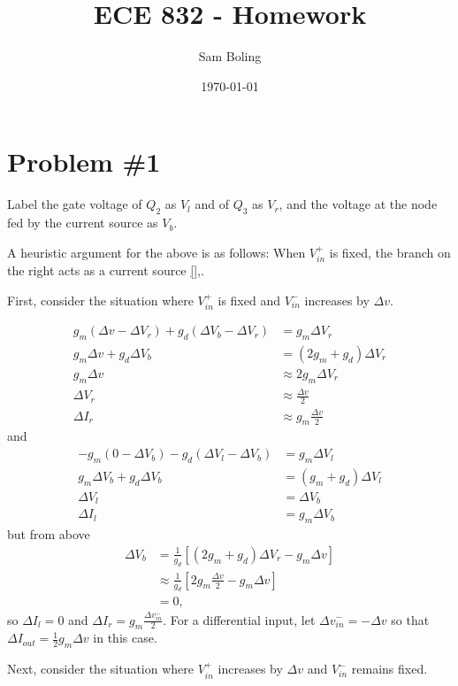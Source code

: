 \documentclass{article}
\title{ECE 832 - Homework}
\author{Sam Boling}
\date{\today}
\begin{document}
\maketitle

\section*{Problem \#1}

Label the gate voltage of $Q_2$ as $V_l$ and of $Q_3$ as $V_r$, and the
voltage at the node fed by the current source as $V_b$.

A heuristic argument for the above is as follows:
When $V_{in}^{+}$ is fixed, the branch on
the right acts as a current source \ref{},. 

First, consider the situation where $V_{in}^{+}$ is fixed and
$V_{in}^{-}$ increases by $\Delta v$.

\begin{align*}
g_m (\Delta v - \Delta V_r) + g_d (\Delta V_b - \Delta V_r) &= g_m \Delta V_r \\
g_m \Delta v + g_d \Delta V_b &= (2 g_m + g_d) \Delta V_r \\
g_m \Delta v &\approx 2 g_m \Delta V_r \\
\Delta V_r &\approx \frac{\Delta v}{2} \\
\Delta I_r &\approx g_m \frac{\Delta v}{2}
\end{align*}
and
\begin{align*}
-g_m (0 - \Delta V_b) - g_d (\Delta V_l - \Delta V_b) &= g_m \Delta V_l \\
g_m \Delta V_b + g_d \Delta V_b &= (g_m + g_d) \Delta V_l \\
\Delta V_l &= \Delta V_b \\
\Delta I_l &= g_m \Delta V_b
\end{align*}
but from above
\begin{align*}
\Delta V_b &= \frac{1}{g_d} [(2 g_m + g_d) \Delta V_r - g_m \Delta v] \\
           &\approx \frac{1}{g_d} [2 g_m \frac{\Delta v}{2} - g_m \Delta v] \\
           &= 0,
\end{align*}
so $\Delta I_l = 0$ and $\Delta I_r = g_m \frac{\Delta v_{in}^{-}}{2}$. For a
differential input, let $\Delta v_{in}^{-} = -\Delta v$ so that
$\Delta I_{out} = \frac{1}{2} g_m \Delta v$ in this case.

Next, consider the situation where $V_{in}^{+}$ increases by $\Delta v$ 
and $V_{in}^{-}$ remains fixed. 
\end{document}
